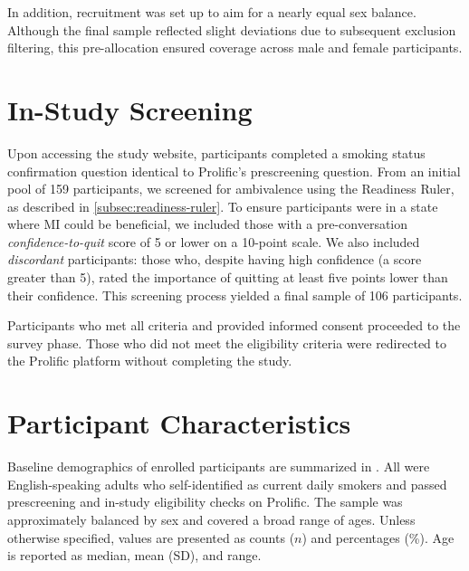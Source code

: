 In addition, recruitment was set up to aim for a nearly equal sex balance. Although the final sample reflected slight deviations due to subsequent exclusion filtering, this pre-allocation ensured coverage across male and female participants.

\section{In-Study Screening}
Upon accessing the study website, participants completed a smoking status confirmation question identical to Prolific's prescreening question. From an initial pool of 159 participants, we screened for ambivalence using the Readiness Ruler, as described in \cref{subsec:readiness-ruler}. To ensure participants were in a state where MI could be beneficial, we included those with a pre-conversation \emph{confidence-to-quit} score of 5 or lower on a 10-point scale. We also included \emph{discordant}
participants: those who, despite having high confidence (a score greater than 5), rated the importance of quitting at least five points lower than their confidence. This screening process yielded a final sample of 106 participants.

Participants who met all criteria and provided informed consent proceeded to the survey phase. Those who did not meet the eligibility criteria were redirected to the Prolific platform without completing the study.

\section{Participant Characteristics}
\label{subsec:participant-characteristics}
\noindent Baseline demographics of enrolled participants are summarized in . All were English-speaking adults who self-identified as current daily smokers and passed prescreening and in-study eligibility checks on Prolific. The sample was approximately balanced by sex and covered a broad range of ages. Unless otherwise specified, values are presented as counts ($n$) and percentages (\%). Age is reported as median, mean (SD), and range.

